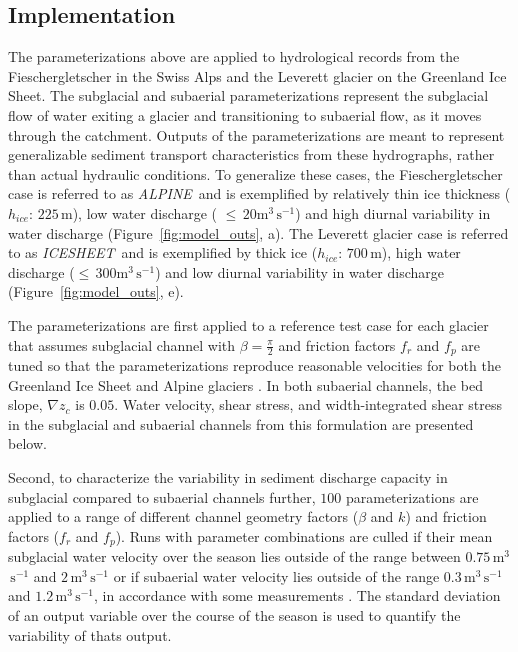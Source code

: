 \documentclass[11pt]{article}
\newcommand{\alpine}{\textit{ALPINE}\,}
\newcommand{\icesheet}{\textit{ICESHEET}\,}
\newcommand{\unit}[1]{$\mathrm{#1}$}
\begin{document}
\subsection{Implementation}
\label{sect:imp}

The parameterizations above are applied to hydrological records from the Fieschergletscher in the Swiss Alps and the Leverett glacier on the Greenland Ice Sheet.
The subglacial and subaerial parameterizations represent the subglacial flow of water exiting a glacier and transitioning to subaerial flow, as it moves through the catchment.
Outputs of the parameterizations are meant to represent generalizable sediment transport characteristics from these hydrographs, rather than actual hydraulic conditions.
To generalize these cases, the Fieschergletscher case is referred to as \alpine{} and is exemplified by relatively thin ice thickness ($h_{ice}$: $225$\,\unit{m}), low water discharge ( $\le\,20$\unit{m}$^3$\,\unit{s}$^{-1}$) and high diurnal variability in water discharge (Figure~\ref{fig:model_outs}, a).
The Leverett glacier case is referred to as \icesheet{} and is exemplified by thick ice  ($h_{ice}$: $700$\,\unit{m}), high water discharge ($\le\,300$\unit{m}$^3$\,\unit{s}$^{-1}$)  and low diurnal variability in water discharge (Figure~\ref{fig:model_outs}, e).

The parameterizations are first applied to a reference test case for each glacier that assumes  subglacial channel with $\beta=\frac{\pi}{2}$ and friction factors $f_r$ and $f_p$ are tuned so that the parameterizations reproduce reasonable velocities for both  the Greenland Ice Sheet and Alpine glaciers \citep[$\sim\,1.6\,$\unit{m}$^3$\,\unit{s}$^{-1}$][]{werder2010b,chandler2013}.
In both subaerial channels, the bed slope, $\nabla z_c$ is $0.05$.
Water velocity, shear stress, and width-integrated shear stress in the subglacial and subaerial channels from this formulation are presented below.  

Second, to characterize the variability in sediment discharge capacity in subglacial compared to subaerial channels further, $100$  parameterizations are applied to a range of different channel geometry factors ($\beta$ and $k$) and friction factors ($f_r$ and $f_p$).
Runs with parameter combinations  are culled if their mean subglacial water velocity over the season lies outside of the range between $0.75$\,\unit{m}$^3$\,\unit{s}$^{-1}$ and $2$\,\unit{m}$^3$\,\unit{s}$^{-1}$ or if subaerial water velocity lies outside of the range $0.3$\,\unit{m}$^3$\,\unit{s}$^{-1}$ and $1.2$\,\unit{m}$^3$\,\unit{s}$^{-1}$, in accordance with some measurements \citep[e.g.]{werder2010b,magnusson2012,chandler2013}.
The standard deviation of an output variable over the course of the season is used to quantify the variability of thats output.
\end{document}
